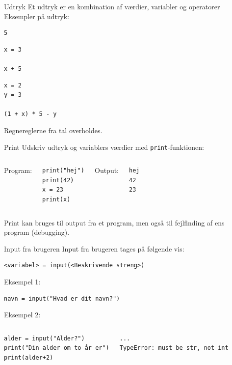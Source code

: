 \documentclass{beamer}
\begin{document}
\begin{frame}[fragile]{Udtryk}
Et udtryk er en kombination af værdier, variabler og operatorer\\
Eksempler på udtryk:
\begin{lstlisting}[style=python]
5
\end{lstlisting}
\begin{lstlisting}[style=python]
x = 3

x + 5
\end{lstlisting}
\begin{lstlisting}[style=python]
x = 2
y = 3

(1 + x) * 5 - y
\end{lstlisting}
Regnereglerne fra tal overholdes.
\end{frame}

\begin{frame}[fragile]{Print}
Udskriv udtryk og variablers værdier med \texttt{print}-funktionen:
\bigskip
\begin{columns}
Program:
\begin{lstlisting}[style=python]
print("hej")
print(42)
x = 23
print(x)
\end{lstlisting}
Output:
\begin{lstlisting}[style=python]
hej
42
23
\end{lstlisting}
\end{columns}
Print kan bruges til output fra et program, men også til fejlfinding af ens program (debugging).
\end{frame}

\begin{frame}[fragile]{Input fra brugeren}
Input fra brugeren tages på følgende vis:
\begin{lstlisting}[style=python]
<variabel> = input(<Beskrivende streng>)
\end{lstlisting}
Eksempel 1:
\begin{lstlisting}[style=python]
navn = input("Hvad er dit navn?")
\end{lstlisting}
\pause
Eksempel 2:	
\begin{columns}
	\begin{lstlisting}[style=python]
alder = input("Alder?")
print("Din alder om to år er")
print(alder+2)
	\end{lstlisting}
	\pause
	\begin{lstlisting}[style=python]
...
TypeError: must be str, not int
	\end{lstlisting}
\end{columns}
\end{frame}
\end{document}
